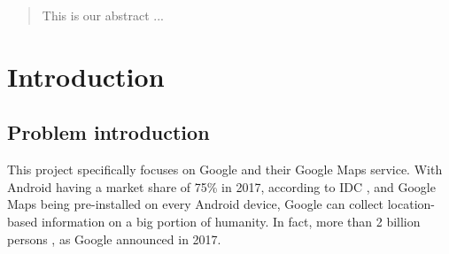 \documentclass[12p]{article}
\begin{document}
		
		\begin{abstract}
			\thispagestyle{plain} %
			
			\noindent This is our abstract
			\newline \newline
			\noindent ...
			
		\end{abstract}
		
		\newpage
		
		
		\tableofcontents %
		\thispagestyle{plain} %
		
		\newpage %
		
		
		\section{Introduction}
		
		\subsection{Problem introduction} \label{ProblemIntroduction}
		
		This project specifically focuses on Google and their Google Maps service. With Android having a market share of 75\% in 2017, according to IDC \cite{SmartphoneOSMarketShare}, and Google Maps being pre-installed on every Android device, Google can collect location-based information on a big portion of humanity. In fact, more than 2 billion persons \cite{AndroidMonthlyActiveUsers}, as Google announced in 2017.
		
\end{document}
